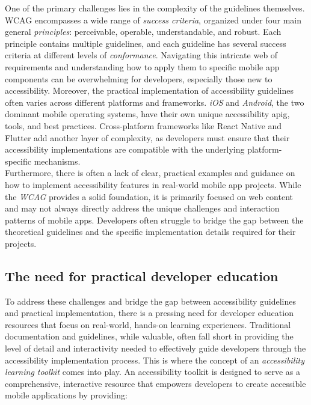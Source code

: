 One of the primary challenges lies in the complexity of the guidelines themselves. WCAG encompasses a wide range of \textit{success criteria}, organized under four main general \textit{principles}: perceivable, operable, understandable, and robust. Each principle contains multiple guidelines, and each guideline has several success criteria at different levels of \textit{conformance}. Navigating this intricate web of requirements and understanding how to apply them to specific mobile app components can be overwhelming for developers, especially those new to accessibility. 
Moreover, the practical implementation of accessibility guidelines often varies across different platforms and frameworks. \textit{iOS} and \textit{Android}, the two dominant mobile operating systems, have their own unique accessibility \gls{apig}, tools, and best practices. Cross-platform frameworks like React Native and Flutter add another layer of complexity, as developers must ensure that their accessibility implementations are compatible with the underlying platform-specific mechanisms. \\ 

Furthermore, there is often a lack of clear, practical examples and guidance on how to implement accessibility features in real-world mobile app projects. While the \textit{WCAG} provides a solid foundation, it is primarily focused on web content and may not always directly address the unique challenges and interaction patterns of mobile apps. Developers often struggle to bridge the gap between the theoretical guidelines and the specific implementation details required for their projects.

\subsection{The need for practical developer education}

To address these challenges and bridge the gap between accessibility guidelines and practical implementation, there is a pressing need for developer education resources that focus on real-world, hands-on learning experiences. Traditional documentation and guidelines, while valuable, often fall short in providing the level of detail and interactivity needed to effectively guide developers through the accessibility implementation process.
This is where the concept of an \textit{accessibility learning toolkit} comes into play. An accessibility toolkit is designed to serve as a comprehensive, interactive resource that empowers developers to create accessible mobile applications by providing:

